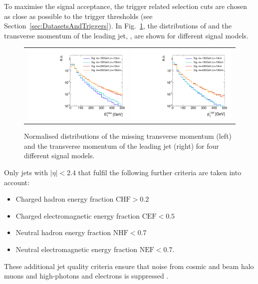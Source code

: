 To maximise the signal acceptance, the trigger related selection cuts are chosen as close as possible to the trigger thresholds (see Section~\ref{sec:DatasetsAndTriggers}).
In Fig.~\ref{fig:SignalMET+SignalJetPt}, the distributions of \met and the transverse momentum of the leading jet, \ptfirstjet, are shown for different signal models.
\begin{figure}[!t]
  \centering 
  \begin{tabular}{c}
    \includegraphics[width=0.49\textwidth]{figures/analysis/AnalysisSelection/hMetSmallRange_log_chiTracksnoSelection_4Signals.pdf}
    \includegraphics[width=0.49\textwidth]{figures/analysis/AnalysisSelection/h1stjetptSmallRange_log_chiTracksnoSelection_4Signals.pdf}
  \end{tabular}
  \caption{Normalised distributions of the missing transverse momentum (left) and the transverse momentum of the leading jet (right) for four different signal models.}
  \label{fig:SignalMET+SignalJetPt}
\end{figure}
Only jets with $|\eta|<2.4$ that fulfil the following further criteria are taken into account:
\begin{itemize}
\item Charged hadron energy fraction $\text{CHF}>0.2$
\item Charged electromagnetic energy fraction $\text{CEF}<0.5$
\item Neutral hadron energy fraction $\text{NHF}<0.7$
\item Neutral electromagnetic energy fraction $\text{NEF}<0.7$.
\end{itemize}
These additional jet quality criteria ensure that noise from cosmic and beam halo muons and high-\pt photons and electrons is suppressed \cite{bib:CMS:DM_8TeV_AN}.

